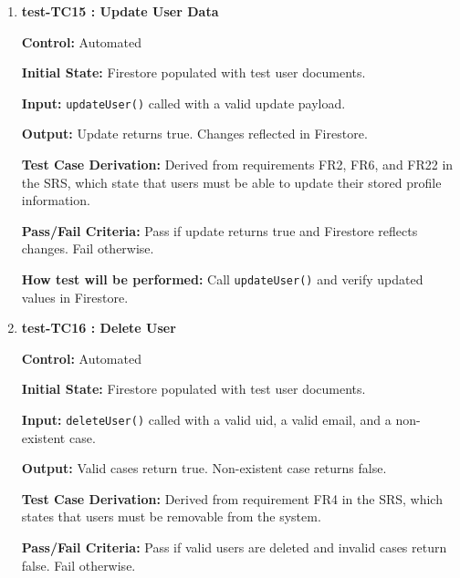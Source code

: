 \documentclass[12pt, titlepage]{article}
\begin{document}
\begin{enumerate}
  \textbf{Test Case Derivation:} Derived from requirement FR21 in the SRS, which specifies that users must be searchable and retrievable by identifying information such as email.

  \textbf{Pass/Fail Criteria:} Pass if valid email returns correct user and invalid email returns null. Fail otherwise.

  \textbf{How test will be performed:} Call \texttt{getUserByEmail()} with both valid and invalid inputs and verify results.

  \vspace{0.5em}

  \item \textbf{test-TC15 : Update User Data}

  \textbf{Control:} Automated

  \textbf{Initial State:} Firestore populated with test user documents.

  \textbf{Input:} \texttt{updateUser()} called with a valid update payload.

  \textbf{Output:} Update returns true. Changes reflected in Firestore.

  \textbf{Test Case Derivation:} Derived from requirements FR2, FR6, and FR22 in the SRS, which state that users must be able to update their stored profile information.

  \textbf{Pass/Fail Criteria:} Pass if update returns true and Firestore reflects changes. Fail otherwise.

  \textbf{How test will be performed:} Call \texttt{updateUser()} and verify updated values in Firestore.


  \vspace{0.5em}

  \item \textbf{test-TC16 : Delete User}

  \textbf{Control:} Automated

  \textbf{Initial State:} Firestore populated with test user documents.

  \textbf{Input:} \texttt{deleteUser()} called with a valid uid, a valid email, and a non-existent case.

  \textbf{Output:} Valid cases return true. Non-existent case returns false.

  \textbf{Test Case Derivation:} Derived from requirement FR4 in the SRS, which states that users must be removable from the system.

  \textbf{Pass/Fail Criteria:} Pass if valid users are deleted and invalid cases return false. Fail otherwise.


\end{enumerate}
\end{document}
